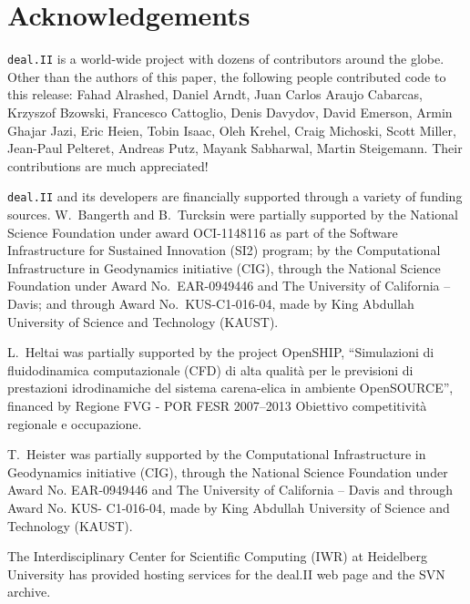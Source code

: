 \documentclass{siamltex}
\newcommand{\specialword}[1]{\texttt{#1}}
\newcommand{\dealii}{{\specialword{deal.II}}}
\begin{document}
\nocite{BangerthKanschat1999}

\section{Acknowledgements}

\dealii{} is a world-wide project with dozens of contributors around the
globe. Other than the authors of this paper, the following people contributed code to
this release: 
  Fahad Alrashed,
  Daniel Arndt,
  Juan Carlos Araujo Cabarcas,
  Krzyszof Bzowski,
  Francesco Cattoglio,
  Denis Davydov,
  David Emerson,
  Armin Ghajar Jazi,
  Eric Heien,
  Tobin Isaac, 
  Oleh Krehel,
  Craig Michoski,
  Scott Miller,
  Jean-Paul Pelteret,
  Andreas Putz,
  Mayank Sabharwal,
  Martin Steigemann.
Their contributions are much appreciated!

\dealii{} and its developers are financially supported through a
variety of funding sources. W.~Bangerth and B.~Turcksin were partially
supported by the National Science Foundation under award OCI-1148116
as part of the Software Infrastructure for Sustained Innovation (SI2)
program; by the Computational Infrastructure in Geodynamics initiative
(CIG), through the National Science Foundation under Award
No.~EAR-0949446 and The University of California -- Davis; and through
Award No.~KUS-C1-016-04, made by King Abdullah University of Science
and Technology (KAUST). 

L.~Heltai was partially supported by the project OpenSHIP,
``Simulazioni di fluidodinamica computazionale (CFD) di alta qualit\`a
per le previsioni di prestazioni idrodinamiche del sistema
carena-elica in ambiente OpenSOURCE'', financed by Regione FVG - POR
FESR 2007–2013 Obiettivo competitivit\`a regionale e occupazione.

T.~Heister was partially supported by the Computational Infrastructure in
Geodynamics initiative (CIG), through the National Science Foundation under Award
No. EAR-0949446 and The University of California -- Davis and through Award No. KUS-
C1-016-04, made by King Abdullah University of Science and Technology (KAUST).

The Interdisciplinary Center for Scientific Computing (IWR) at Heidelberg University has provided 
hosting services for the deal.II web page and the SVN archive.
 






{}

\end{document}
